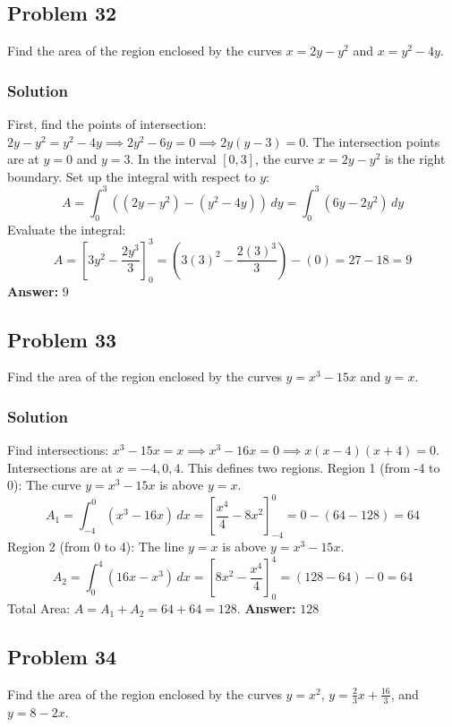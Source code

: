 \documentclass{article}
\begin{document}
\subsection{Problem 32}
Find the area of the region enclosed by the curves $x = 2y - y^2$ and $x = y^2 - 4y$.
\subsubsection*{Solution}
First, find the points of intersection: $2y - y^2 = y^2 - 4y \implies 2y^2 - 6y = 0 \implies 2y(y-3) = 0$. The intersection points are at $y=0$ and $y=3$.
In the interval $[0, 3]$, the curve $x = 2y - y^2$ is the right boundary.
Set up the integral with respect to $y$:
$$ A = \int_{0}^{3} ((2y - y^2) - (y^2 - 4y)) \,dy = \int_{0}^{3} (6y - 2y^2) \,dy $$
Evaluate the integral:
$$ A = \left[ 3y^2 - \frac{2y^3}{3} \right]_{0}^{3} = \left(3(3)^2 - \frac{2(3)^3}{3}\right) - (0) = 27 - 18 = 9 $$
\textbf{Answer:} $ 9 $

\subsection{Problem 33}
Find the area of the region enclosed by the curves $y = x^3 - 15x$ and $y = x$.
\subsubsection*{Solution}
Find intersections: $x^3 - 15x = x \implies x^3 - 16x = 0 \implies x(x-4)(x+4) = 0$. Intersections are at $x=-4, 0, 4$. This defines two regions.
Region 1 (from -4 to 0): The curve $y = x^3 - 15x$ is above $y=x$.
$$ A_1 = \int_{-4}^{0} (x^3 - 16x) \,dx = \left[ \frac{x^4}{4} - 8x^2 \right]_{-4}^{0} = 0 - (64 - 128) = 64 $$
Region 2 (from 0 to 4): The line $y=x$ is above $y = x^3 - 15x$.
$$ A_2 = \int_{0}^{4} (16x - x^3) \,dx = \left[ 8x^2 - \frac{x^4}{4} \right]_{0}^{4} = (128 - 64) - 0 = 64 $$
Total Area: $A = A_1 + A_2 = 64 + 64 = 128$.
\textbf{Answer:} $ 128 $

\subsection{Problem 34}
Find the area of the region enclosed by the curves $y = x^2$, $y = \frac{2}{3}x + \frac{16}{3}$, and $y = 8 - 2x$.
\end{document}
